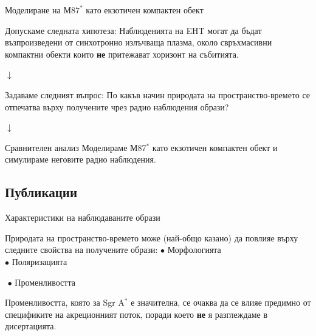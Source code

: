 \documentclass[hyperref={colorlinks,citecolor=blue,linkcolor=blue,urlcolor=blue}]{beamer}
\begin{document}
	\begin{frame}{Моделиране на М$87^*$ като екзотичен компактен обект}		
		
		\begin{block}{Допускаме следната хипотеза:}
			Наблюденията на EHT могат да
			бъдат възпроизведени от синхотронно излъчваща плазма, около свръхмасивни
			компактни обекти които \textbf{не} притежават хоризонт на събитията.
		\end{block}	
		
		\begin{center}
			$\downarrow$
		\end{center}
		\begin{alertblock}{Задаваме следният въпрос:}
			По какъв начин природата на пространство-времето се отпечатва върху получените чрез радио наблюдения образи?
		\end{alertblock}
		\begin{center}
			$\downarrow$
		\end{center}
		\begin{block}{Сравнителен анализ}
			Моделираме М87$^*$ като екзотичен компактен обект и симулираме неговите радио наблюдения.
		\end{block}
		
	\end{frame}
	
	\subsection{Публикации}
	
	\begin{frame}{Характеристики на наблюдаваните образи}
		\begin{block}{Природата на пространство-времето може (най-общо казано) да повлияе върху следните свойства на получените образи:}
			\centering
			$\bullet$ Морфологията\\
			$\bullet$ Поляризацията
			\begin{alertblock}{$ $}
				\centering
				$\bullet$ Променливостта
			\end{alertblock}
			
		\end{block}
		
		Променливостта, която за Sgr A$^*$ е значителна, се очаква да се влияе предимно от спецификите на акреционният поток, поради което \textbf{не} я разглеждаме в дисертацията.
		
	\end{frame}
	
\end{document}
